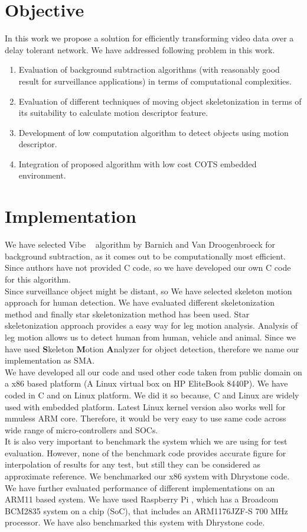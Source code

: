 \documentclass[a4paper, 12pt, twoside]{synopsis}  %
\begin{document}
\section{Objective}
\indent	In this work we propose a solution for efficiently transforming
video data   over   a delay   tolerant   network.  We have addressed
following problem in this work.\\
\begin{enumerate}
\item Evaluation of background subtraction algorithms (with reasonably
good result for surveillance applications) in terms of computational
complexities. 
\item Evaluation of different techniques of moving object
skeletonization in terms of its suitability to calculate motion
descriptor feature. 
\item Development of low computation algorithm to detect objects using
motion descriptor.
\item Integration of proposed algorithm with low cost COTS embedded
environment.
\end{enumerate}
\section{Implementation}
\indent We have selected Vibe ~\cite{5} algorithm by Barnich and Van
Droogenbroeck for background subtraction, as it comes out to be
computationally most efficient. Since authors have not provided C code,
so we have developed our own C code for this algorithm.\\
\indent Since surveillance object might be distant, so We have selected
skeleton motion approach for human detection. We have evaluated
different skeletonization method and finally star skeletonization method
has been used. Star skeletonization approach provides a easy way for leg
motion analysis. Analysis of leg motion allows us to detect human from
human, vehicle and animal. Since we have used \textbf{S}keleton
\textbf{M}otion \textbf{A}nalyzer for object detection, therefore we
name our implementation as SMA.\\
\indent We have developed all our code and used other code taken from
public domain on a x86 based platform (A Linux virtual box on HP
EliteBook 8440P). We have coded in C and on Linux platform. We did it so
because, C and Linux are widely used with embedded platform. Latest
Linux kernel version also works well for mmuless ARM core. Therefore, it
would be very easy to use same code across wide range of
micro-controllers and SOCs.\\
\indent It is also very important to benchmark the system which we are
using for test evaluation. However, none of the benchmark code provides
accurate figure for interpolation of results for any test, but still
they can be considered as approximate reference. We benchmarked our x86
system with Dhrystone code.\\
\indent We have further evaluated performance of different
implementations on an ARM11 based system. We have used Raspberry Pi ,
which has a Broadcom BCM2835 system on a chip (SoC), that includes an
ARM1176JZF-S 700 MHz processor. We have also benchmarked this system
with Dhrystone code.
\end{document}
